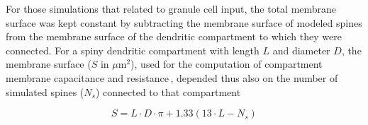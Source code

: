 \documentclass[12pt]{article}
\begin{document}
For those simulations that
related to granule cell input, the total membrane surface was kept
constant by subtracting the membrane surface of modeled spines
from the membrane surface of the
dendritic compartment to which they were connected.
For a spiny dendritic compartment with length $L$ and diameter $D$, the
membrane surface ($S$ in $\mu$m$^2$), used for the computation of compartment
membrane capacitance and resistance\,\cite{R:1989cr, Rapp-M:1992kx},
depended thus also on the number
of simulated spines ($N_s$) connected to that compartment

\begin{equation}
   S = L\cdot D\cdot \pi + 1.33(13\cdot L - N_s)
\end{equation}



\end{document}
